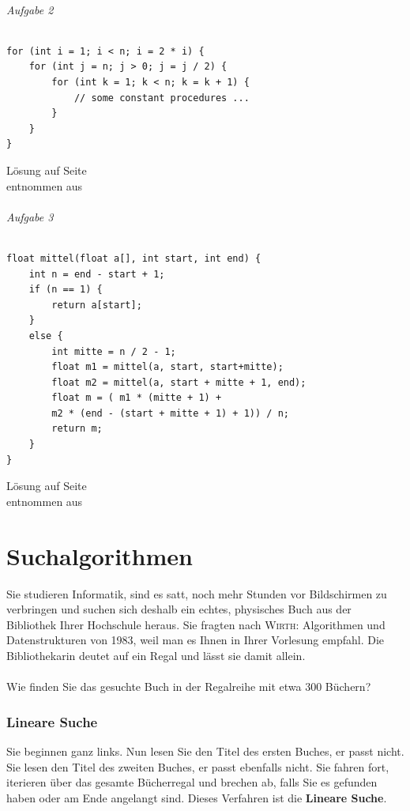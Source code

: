 \documentclass[11pt,a4paper]{scrartcl}
\begin{document}
\paragraph{Aufgabe 2} \quad
\begin{lstlisting}
for (int i = 1; i < n; i = 2 * i) {
	for (int j = n; j > 0; j = j / 2) {
		for (int k = 1; k < n; k = k + 1) {
			// some constant procedures ...		
		}	
	}
}
\end{lstlisting}
\begin{flushright}
Lösung auf Seite \pageref{a1.6:lsg} \\
entnommen aus \parencite{GrUeb}
\end{flushright}
\paragraph{Aufgabe 3} \quad
\begin{lstlisting}
float mittel(float a[], int start, int end) {
	int n = end - start + 1;
	if (n == 1) {
		return a[start];	
	}
	else {
		int mitte = n / 2 - 1;
		float m1 = mittel(a, start, start+mitte);
		float m2 = mittel(a, start + mitte + 1, end);
		float m = (	m1 * (mitte + 1) + 
		m2 * (end - (start + mitte + 1) + 1)) / n;
		return m;	
	}
}
\end{lstlisting}
\begin{flushright}
Lösung auf Seite \pageref{a1.7:lsg} \\
entnommen aus \parencite{GrUeb}
\end{flushright}
\part{Suchalgorithmen}
Sie studieren Informatik, sind es satt, noch mehr Stunden vor Bildschirmen zu verbringen und suchen sich deshalb ein echtes, physisches Buch aus der Bibliothek Ihrer Hochschule heraus. Sie fragten nach \glqq\textsc{Wirth}: Algorithmen und Datenstrukturen{\grqq} von 1983, weil man es Ihnen in Ihrer Vorlesung empfahl. Die Bibliothekarin deutet auf ein Regal und lässt sie damit allein. \\\\
Wie finden Sie das gesuchte Buch in der Regalreihe mit etwa 300 Büchern?
\section{Lineare Suche}
Sie beginnen ganz links. Nun lesen Sie den Titel des ersten Buches, er passt nicht. Sie lesen den Titel des zweiten Buches, er passt ebenfalls nicht. Sie fahren fort, iterieren über das gesamte Bücherregal und brechen ab, falls Sie es gefunden haben oder am Ende angelangt sind. Dieses Verfahren ist die \textbf{Lineare Suche}.
\end{document}
